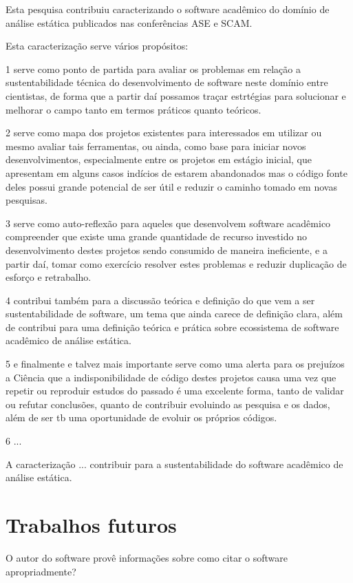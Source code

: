 Esta pesquisa contribuiu caracterizando o software acadêmico do domínio
de análise estática publicados nas conferências ASE e SCAM.

Esta caracterização serve vários propósitos:

1 serve como ponto de partida para avaliar os problemas em relação a sustentabilidade
técnica do desenvolvimento de software neste domínio entre cientistas, de forma
que a partir daí possamos traçar estrtégias para solucionar e melhorar o campo tanto
em termos práticos quanto teóricos.

2 serve como mapa dos projetos existentes para interessados em utilizar ou mesmo
avaliar tais ferramentas, ou ainda, como base para iniciar novos desenvolvimentos,
especialmente entre os projetos em estágio inicial, que apresentam em alguns casos
indícios de estarem abandonados mas o código fonte deles possui grande potencial
de ser útil e reduzir o caminho tomado em novas pesquisas.

3 serve como auto-reflexão para aqueles que desenvolvem software acadêmico
compreender que existe uma grande quantidade de recurso investido no desenvolvimento
destes projetos sendo consumido de maneira ineficiente, e a partir daí, tomar
como exercício resolver estes problemas e reduzir duplicação de esforço e retrabalho.

4 contribui também para a discussão teórica e definição do que vem a ser sustentabilidade
de software, um tema que ainda carece de definição clara, além de contribui para
uma definição teórica e prática sobre ecossistema de software acadêmico de análise estática.

5 e finalmente e talvez mais importante  serve como uma alerta para os prejuízos
a Ciência que a indisponibilidade de código destes projetos causa uma vez que repetir
ou reproduir estudos do passado é uma excelente forma, tanto de validar ou refutar conclusões,
quanto de contribuir evoluindo as pesquisa e os dados, além de ser tb uma oportunidade
de evoluir os próprios códigos.

6 ...

A caracterização ... contribuir para a sustentabilidade do software acadêmico
de análise estática.

\section{Trabalhos futuros}

O autor do software provê informações sobre como citar o software apropriadmente? \cite{allen2017engineering}

